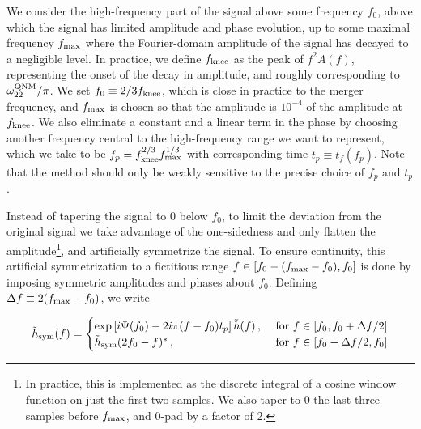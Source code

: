 \documentclass[aps,showpacs,twocolumn,
prd,superscriptaddress,nofootinbib]{revtex4-1}
\newcommand{\be}{\begin{equation}}
\newcommand{\ee}{\end{equation}}
\newcommand{\tf}{t_{f}}
\begin{document}
We consider the high-frequency part of the signal above some frequency $f_{0}$, above which the signal has limited amplitude and phase evolution, up to some maximal frequency $f_{\rm max}$ where the Fourier-domain amplitude of the signal has decayed to a negligible level. In practice, we define $f_{\rm knee}$ as the peak of $f^{2}A(f)$, representing the onset of the decay in amplitude, and roughly corresponding to $\omega_{22}^{\rm QNM}/\pi$. We set $f_{0}\equiv 2/3f_{\rm knee}$, which is close in practice to the merger frequency, and $f_{\rm max}$ is chosen so that the amplitude is $10^{-4}$ of the amplitude at $f_{\rm knee}$. We also eliminate a constant and a linear term in the phase by choosing another frequency central to the high-frequency range we want to represent, which we take to be $f_{p} = f_{\rm knee}^{2/3} f_{\rm max}^{1/3}$ with corresponding time $t_{p}\equiv \tf(f_{p})$. Note that the method should only be weakly sensitive to the precise choice of $f_{p}$ and $t_{p}$.

Instead of tapering the signal to $0$ below $f_{0}$, to limit the deviation from the original signal we take advantage of the one-sidedness and only flatten the amplitude\footnote{In practice, this is implemented as the discrete integral of a cosine window function on just the first two samples. We also taper to 0 the last three samples before $f_{\rm max}$, and $0$-pad by a factor of 2.}, and artificially symmetrize the signal. To ensure continuity, this artificial symmetrization to a fictitious range $f\in [f_{0} - (f_{\rm max} - f_{0}), f_{0}]$ is done by imposing symmetric amplitudes and phases about $f_{0}$. Defining $\Delta f \equiv 2 (f_{\rm max} - f_{0})$, we write
\begin{widetext}
\be\label{eq:defhsym}
	\tilde{h}_{\rm sym}(f) = 
	\begin{cases} 
		\exp\left[i \Psi(f_{0}) - 2i\pi (f-f_{0}) t_{p} \right] \tilde{h}(f) \,,  &\text{ for } f \in [f_{0}, f_{0} + \Delta f /2] \\
	\tilde{h}_{\rm sym}(2 f_{0} - f)^{*} \,,  &\text{ for } f \in [f_{0} - \Delta f/2, f_{0}]
	\end{cases}
\ee
\end{widetext}
\end{document}
